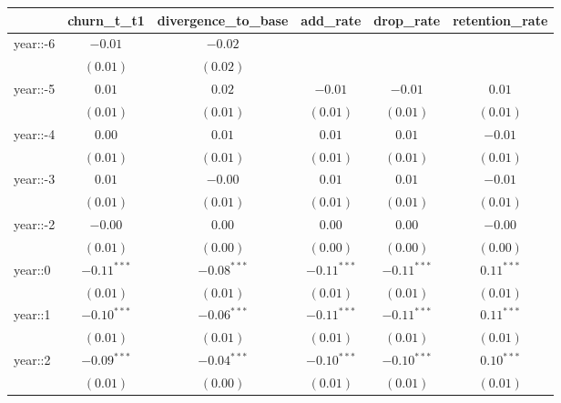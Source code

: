 
\begin{table}
\begin{center}
\begin{tabular}{l c c c c c}
\hline
 & churn_t_t1 & divergence_to_base & add_rate & drop_rate & retention_rate \\
\hline
year::-6                & $-0.01$       & $-0.02$       &               &               &              \\
                        & $(0.01)$      & $(0.02)$      &               &               &              \\
year::-5                & $0.01$        & $0.02$        & $-0.01$       & $-0.01$       & $0.01$       \\
                        & $(0.01)$      & $(0.01)$      & $(0.01)$      & $(0.01)$      & $(0.01)$     \\
year::-4                & $0.00$        & $0.01$        & $0.01$        & $0.01$        & $-0.01$      \\
                        & $(0.01)$      & $(0.01)$      & $(0.01)$      & $(0.01)$      & $(0.01)$     \\
year::-3                & $0.01$        & $-0.00$       & $0.01$        & $0.01$        & $-0.01$      \\
                        & $(0.01)$      & $(0.01)$      & $(0.01)$      & $(0.01)$      & $(0.01)$     \\
year::-2                & $-0.00$       & $0.00$        & $0.00$        & $0.00$        & $-0.00$      \\
                        & $(0.01)$      & $(0.00)$      & $(0.00)$      & $(0.00)$      & $(0.00)$     \\
year::0                 & $-0.11^{***}$ & $-0.08^{***}$ & $-0.11^{***}$ & $-0.11^{***}$ & $0.11^{***}$ \\
                        & $(0.01)$      & $(0.01)$      & $(0.01)$      & $(0.01)$      & $(0.01)$     \\
year::1                 & $-0.10^{***}$ & $-0.06^{***}$ & $-0.11^{***}$ & $-0.11^{***}$ & $0.11^{***}$ \\
                        & $(0.01)$      & $(0.01)$      & $(0.01)$      & $(0.01)$      & $(0.01)$     \\
year::2                 & $-0.09^{***}$ & $-0.04^{***}$ & $-0.10^{***}$ & $-0.10^{***}$ & $0.10^{***}$ \\
                        & $(0.01)$      & $(0.00)$      & $(0.01)$      & $(0.01)$      & $(0.01)$     \\

\end{tabular}
\end{center}
\end{table}
